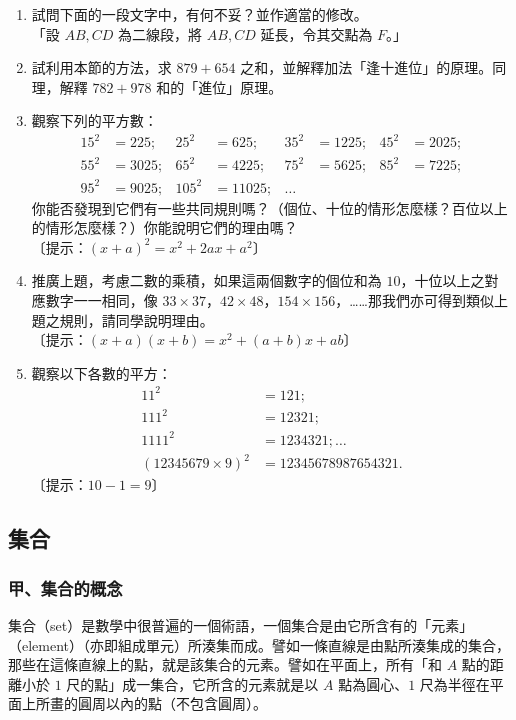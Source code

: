 \begin{enumerate}[1., leftmargin=2em]
\begin{enumerate}[(i)]
    \item $\angle A + \angle C = 180^\circ$。
    \item $AB \parallel CD$。
  \end{enumerate}
  \item 試問下面的一段文字中，有何不妥？並作適當的修改。\\
  「設 $AB, CD$ 為二線段，將 $AB, CD$ 延長，令其交點為 $F$。」
  \item 試利用本節的方法，求 $879 + 654$ 之和，並解釋加法「逢十進位」的原理。同理，解釋 $782 + 978$ 和的「進位」原理。
  \item 觀察下列的平方數：
  \begin{align*}
    15^2 &= 225; & 25^2 &= 625; & 35^2 &= 1225; & 45^2 &= 2025; \\
    55^2 &= 3025; & 65^2 &= 4225; & 75^2 &= 5625; & 85^2 &= 7225; \\
    95^2 &= 9025; & 105^2 &= 11025; & \dots
  \end{align*}
  你能否發現到它們有一些共同規則嗎？（個位、十位的情形怎麼樣？百位以上的情形怎麼樣？）你能說明它們的理由嗎？\\
  〔提示：$(x+a)^2 = x^2 + 2ax + a^2$〕
  \item 推廣上題，考慮二數的乘積，如果這兩個數字的個位和為 $10$，十位以上之對應數字一一相同，像 $33 \times 37$，$42 \times 48$，$154 \times 156$，……那我們亦可得到類似上題之規則，請同學說明理由。\\
  〔提示：$(x+a)(x+b) = x^2 + (a+b)x + ab$〕
  \item[*] 觀察以下各數的平方：
  \begin{align*}
    11^2 &= 121; \\
    111^2 &= 12321; \\
    1111^2 &= 1234321; \dots \\
    (12345679 \times 9)^2 &= 12345678987654321.
  \end{align*}
  〔提示：$10 - 1 = 9$〕
\end{enumerate}

\subsection{集合}\label{sec:2-3}

\subsubsection*{甲、集合的概念}\label{subsec:2-3-a}

集合（set）是數學中很普遍的一個術語，一個集合是由它所含有的「元素」（element）（亦即組成單元）所湊集而成。譬如一條直線是由點所湊集成的集合，那些在這條直線上的點，就是該集合的元素。譬如在平面上，所有「和 $A$ 點的距離小於 $1$ 尺的點」成一集合，它所含的元素就是以 $A$ 點為圓心、$1$ 尺為半徑在平面上所畫的圓周以內的點（不包含圓周）。

